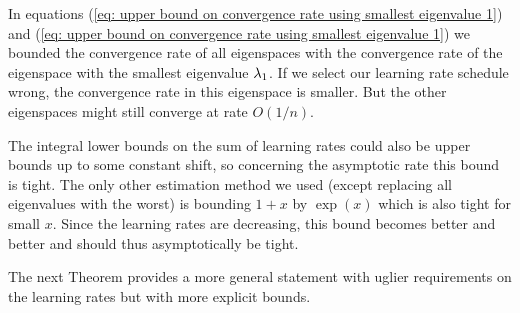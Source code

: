 \begin{remark}\label{rem: rate is retained for larger eigenvalues}
	In equations (\ref{eq: upper bound on convergence rate using smallest eigenvalue 1})
	and (\ref{eq: upper bound on convergence rate using smallest eigenvalue 1})
	we bounded the convergence rate of all eigenspaces with the convergence rate
	of the eigenspace with the smallest eigenvalue \(\lambda_1\). If we select
	our learning rate schedule wrong, the convergence rate in this eigenspace
	is smaller. But the other eigenspaces might still converge at rate \(O(1/n)\).
\end{remark}
\begin{remark}
	The integral lower bounds on the sum of learning rates could also be upper bounds
	up to some constant shift, so concerning the asymptotic rate this bound is
	tight. The only other estimation method we used (except replacing all
	eigenvalues with the worst) is bounding \(1+x\) by \(\exp(x)\) which is
	also tight for small \(x\). Since the learning rates are decreasing, this
	bound becomes better and better and should thus asymptotically be tight.
\end{remark}

The next Theorem provides a more general statement with uglier requirements on
the learning rates but with more explicit bounds.

